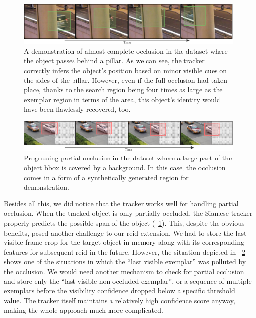 \begin{figure}[!t]
    \centering
    \includegraphics[width=\linewidth]{figures/siamese_tracking/pillar_occlusion.pdf}
    \caption[Pillar occlusion in \uadetrac{} dataset]{A demonstration of almost complete occlusion in the \uadetrac{} dataset where the object passes behind a pillar. As we can see, the tracker correctly infers the object's position based on minor visible cues on the sides of the pillar. However, even if the full occlusion had taken place, thanks to the search region being four times as large as the exemplar region in terms of the area, this object's identity would have been flawlessly recovered, too.}
    \label{fig:UADETRACPillarOcclusion}
\end{figure}

\begin{figure}[!t]
    \centering
    \includegraphics[width=\linewidth]{figures/siamese_tracking/progressing_partial_occlusion.pdf}
    \caption[Progressing occlusion in \uadetrac{} dataset]{Progressing partial occlusion in the \uadetrac{} dataset where a large part of the object \gls{bbox} is covered by a background. In this case, the occlusion comes in a form of a synthetically generated region for demonstration.}
    \label{fig:UADETRACProgressingOcclusion}
\end{figure}

Besides all this, we did notice that the tracker works well for handling partial occlusion. When the tracked object is only partially occluded, the Siamese tracker properly predicts the possible span of the object (\figtext{}~\ref{fig:UADETRACPillarOcclusion}). This, despite the obvious benefits, posed another challenge to our \gls{reid} extension. We had to store the last visible frame crop for the target object in memory along with its corresponding features for subsequent \gls{reid} in the future. However, the situation depicted in \figtext{}~\ref{fig:UADETRACProgressingOcclusion} shows one of the situations in which the ``last visible exemplar'' was polluted by the occlusion. We would need another mechanism to check for partial occlusion and store only the ``last visible non-occluded exemplar'', or a sequence of multiple exemplars before the visibility confidence dropped below a specific threshold value. The tracker itself maintains a relatively high confidence score anyway, making the whole approach much more complicated.

